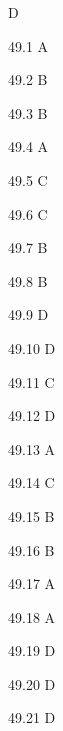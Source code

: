 \begin{Solution}{49}
D
\end{Solution}
\begin{Solution}{49.{1}}
A
\end{Solution}
\begin{Solution}{49.{2}}
B
\end{Solution}
\begin{Solution}{49.{3}}
B
\end{Solution}
\begin{Solution}{49.{4}}
A
\end{Solution}
\begin{Solution}{49.{5}}
C
\end{Solution}
\begin{Solution}{49.{6}}
C
\end{Solution}
\begin{Solution}{49.{7}}
B
\end{Solution}
\begin{Solution}{49.{8}}
B
\end{Solution}
\begin{Solution}{49.{9}}
D
\end{Solution}
\begin{Solution}{49.{10}}
D
\end{Solution}
\begin{Solution}{49.{11}}
C
\end{Solution}
\begin{Solution}{49.{12}}
D
\end{Solution}
\begin{Solution}{49.{13}}
A
\end{Solution}
\begin{Solution}{49.{14}}
C
\end{Solution}
\begin{Solution}{49.{15}}
B
\end{Solution}
\begin{Solution}{49.{16}}
B
\end{Solution}
\begin{Solution}{49.{17}}
A
\end{Solution}
\begin{Solution}{49.{18}}
A
\end{Solution}
\begin{Solution}{49.{19}}
D
\end{Solution}
\begin{Solution}{49.{20}}
D
\end{Solution}
\begin{Solution}{49.{21}}
D
\end{Solution}
